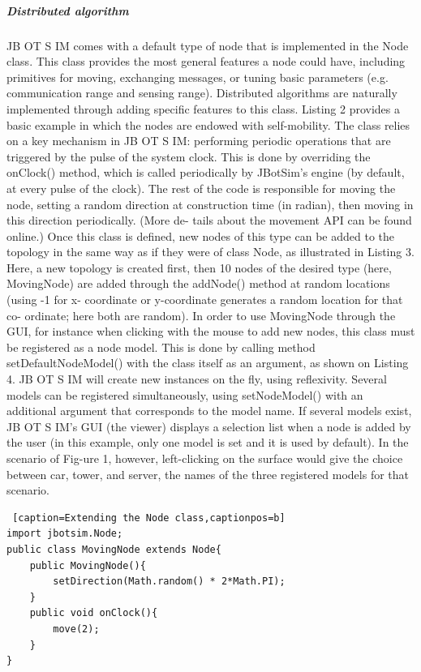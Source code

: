 \subparagraph{Distributed algorithm}JB OT S IM comes with a default type of node that is implemented in the Node class. This class provides the most general features a node could have, including primitives for moving, exchanging messages, or tuning basic parameters (e.g. communication range and sensing range). Distributed algorithms are naturally implemented through adding specific features to this class. Listing 2 provides a basic example in which the nodes are endowed with self-mobility. The class relies on a key mechanism in JB OT S IM: performing periodic operations that are triggered by the pulse of the system clock. This is done by overriding the onClock() method, which is called periodically by JBotSim’s engine (by default, at every pulse of the clock). The rest of the code is responsible for moving the node, setting a random direction at construction time (in radian), then moving in this direction periodically. (More de- tails about the movement API can be found online.) Once this class is defined, new nodes of this type can be added to the topology in the same way as if they were of class Node, as illustrated in Listing 3. Here, a new topology is created first, then 10 nodes of the desired type (here, MovingNode) are added through the addNode() method at random locations (using -1 for x- coordinate or y-coordinate generates a random location for that co- ordinate; here both are random). In order to use MovingNode through the GUI, for instance when clicking with the mouse to add new nodes, this class must be registered as a node model. This is done by calling method setDefaultNodeModel() with the class itself as an argument, as shown on Listing 4. JB OT S IM will create new instances on the fly, using reflexivity. Several models can be registered simultaneously, using setNodeModel() with an additional argument that corresponds to the model name. If several models exist, JB OT S IM’s GUI (the viewer) displays a selection list when a node is added by the user (in this example, only one model is set and it is used by default). In the scenario of Fig-ure 1, however, left-clicking on the surface would give the choice between car, tower, and server, the names of the three registered models for that scenario.
\begin{lstlisting} [caption=Extending the Node class,captionpos=b]
import jbotsim.Node;
public class MovingNode extends Node{
	public MovingNode(){
		setDirection(Math.random() * 2*Math.PI);
	}
	public void onClock(){
		move(2);
	}
}
\end{lstlisting}

